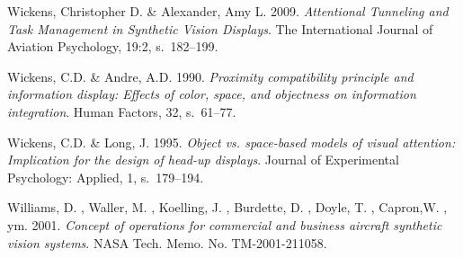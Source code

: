 \documentclass[utf8,bachelor,manualbib]{gradu3}
\begin{document}
\begin{thebibliography}{}
Wickens, Christopher D. \& Alexander, Amy L. 2009.
\textit{Attentional Tunneling and Task Management in Synthetic Vision Displays}.
The International Journal of Aviation Psychology, 19:2, s.~182--199.

Wickens, C.D. \& Andre, A.D. 1990.
\textit{Proximity compatibility principle and information display: Effects
of color, space, and objectness on information integration}.
Human Factors, 32, s.~61--77.

Wickens, C.D. \& Long, J. 1995.
\textit{Object vs. space-based models of visual attention: Implication for the design of head-up displays}.
Journal of Experimental Psychology: Applied, 1, s.~179--194.

Williams, D. , Waller, M. , Koelling, J. , Burdette, D. , Doyle, T. , Capron,W. , ym. 2001.
\textit{Concept of operations for commercial and business aircraft synthetic vision systems}.
NASA Tech. Memo. No. TM-2001-211058.

\end{thebibliography}
\end{document}
